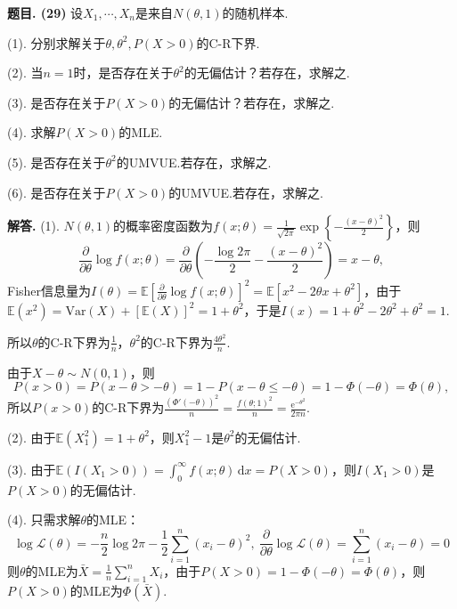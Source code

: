 \documentclass[12pt, a4paper, oneside]{ctexart}
\newcounter{problem}  %
\newenvironment{problem}[1][]{\stepcounter{problem}\par\noindent\textbf{题目\arabic{problem}. #1}}{\smallskip\par}
\newenvironment{solution}[1][]{\par\noindent\textbf{#1解答. }}{\smallskip\par}  %
\let\leq=\leqslant %
\def\E{\mathbb{E}}          %
\def\var{\text{Var}}        %
\def\d{\mathrm{d}}          %
\def\e{\mathrm{e}}          %
\def\L{\mathcal{L}}         %
\def\add{\vspace{1ex}}      %
\begin{document}
\begin{problem}[(29)]
    设$X_1,\cdots,X_n$是来自$N(\theta,1)$的随机样本.

    (1). 分别求解关于$\theta, \theta^2, P(X>0)$的C-R下界.

    (2). 当$n=1$时，是否存在关于$\theta^2$的无偏估计？若存在，求解之.

    (3). 是否存在关于$P(X>0)$的无偏估计？若存在，求解之.

    (4). 求解$P(X>0)$的MLE.

    (5). 是否存在关于$\theta^2$的UMVUE.若存在，求解之.

    (6). 是否存在关于$P(X>0)$的UMVUE.若存在，求解之.\add
\end{problem}
\begin{solution}
    (1). $N(\theta,1)$的概率密度函数为$f(x;\theta) = \frac{1}{\sqrt{2\pi}}\exp\left\{-\frac{(x-\theta)^2}{2}\right\}$，则
    \begin{equation*}
        \frac{\partial}{\partial\theta}\log f(x;\theta) = \frac{\partial}{\partial\theta}\left(-\frac{\log 2\pi}{2}-\frac{(x-\theta)^2}{2}\right) = x-\theta,
    \end{equation*}
    Fisher信息量为$I(\theta) = \E\left[\frac{\partial}{\partial\theta}\log f(x;\theta)\right]^2 = \E[x^2-2\theta x+\theta^2]$，\add 由于$\E(x^2) = \var(X) + [\E(X)]^2 = 1+\theta^2$，于是$I(x) = 1+\theta^2-2\theta^2+\theta^2 =1$.

    所以$\theta$的C-R下界为$\frac{1}{n}$，$\theta^2$的C-R下界为$\frac{4\theta^2}{n}$.
    
    由于$X-\theta\sim N(0,1)$，则
    \begin{equation*}
        P(x>0) = P(x-\theta > -\theta) = 1-P(x-\theta\leq -\theta) = 1-\Phi(-\theta)=\Phi(\theta),
    \end{equation*}
    所以$P(x > 0)$的C-R下界为$\frac{\left(\Phi'(-\theta)\right)^2}{n} = \frac{f(\theta;1)^2}{n} = \frac{\e^{-\theta^2}}{2\pi n}$.\add

    (2). 由于$\E(X_1^2) = 1+\theta^2$，则$X_1^2-1$是$\theta^2$的无偏估计.

    (3). 由于$\E(I(X_1 > 0)) = \int_0^\infty f(x;\theta)\,\d x = P(X>0)$，则$I(X_1>0)$是$P(X>0)$的无偏估计.

    (4). 只需求解$\theta$的MLE：
    \begin{equation*}
        \log\L(\theta) = -\frac{n}{2}\log 2\pi-\frac{1}{2}\sum_{i=1}^n(x_i-\theta)^2,\ \frac{\partial}{\partial\theta}\log\L(\theta) = \sum_{i=1}^n(x_i-\theta) = 0
    \end{equation*}
    则$\theta$的MLE为$\bar{X} = \frac{1}{n}\sum_{i=1}^nX_i$，由于$P(X>0) = 1-\Phi(-\theta)=\Phi(\theta)$，则$P(X>0)$的MLE为$\Phi(\bar{X})$.


\end{solution}
\end{document}
